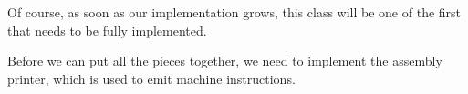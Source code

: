Of course, as soon as our implementation grows, this class will be one of the first that needs to be fully implemented.

Before we can put all the pieces together, we need to implement the assembly printer, which is used to emit machine instructions.

















































